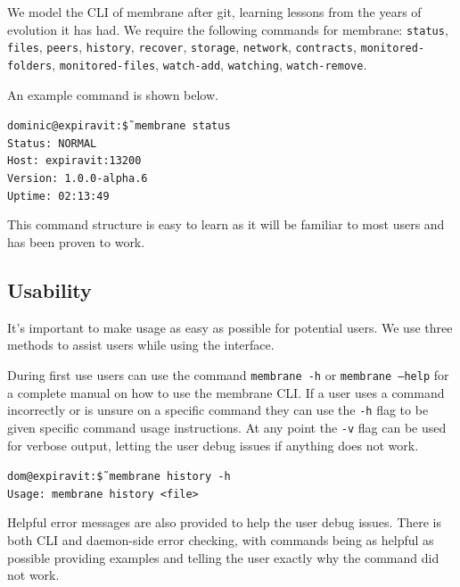 \documentclass[11pt, a4paper, twocolumn, twoside]{report}
\def\code#1{\texttt{#1}}
\begin{document}
We model the CLI of membrane after git, learning lessons from the years of evolution it has had. We require the following commands for membrane: \code{status}, \code{files}, \code{peers}, \code{history}, \code{recover}, \code{storage}, \code{network}, \code{contracts}, \code{monitored-folders}, \code{monitored-files}, \code{watch-add}, \code{watching}, \code{watch-remove}.

An example command is shown below.

\begin{displayquote}
 \scriptsize
 \code{dominic@expiravit:\~\$ membrane status} \\
 \code{Status:         NORMAL} \\
 \code{Host:           expiravit:13200} \\
 \code{Version:        1.0.0-alpha.6} \\
 \code{Uptime:         02:13:49}
\end{displayquote}

This command structure is easy to learn as it will be familiar to most users and has been proven to work.

\subsection{Usability}

It's important to make usage as easy as possible for potential users. We use three methods to assist users while using the interface.

During first use users can use the command \code{membrane -h} or \code{membrane --help} for a complete manual on how to use the membrane CLI. If a user uses a command incorrectly or is unsure on a specific command they can use the \code{-h} flag to be given specific command usage instructions. At any point the \code{-v} flag can be used for verbose output, letting the user debug issues if anything does not work.

\begin{displayquote}
 \scriptsize
 \code{dom@expiravit:\~\$ membrane history -h} \\
 \code{Usage: membrane history <file>}
\end{displayquote}

Helpful error messages are also provided to help the user debug issues. There is both CLI and daemon-side error checking, with commands being as helpful as possible providing examples and telling the user exactly why the command did not work.
\end{document}
